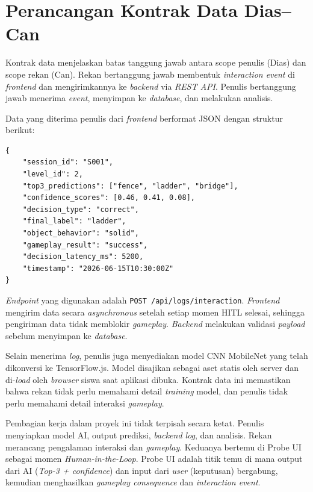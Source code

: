 \documentclass[10pt,twoside,openright]{report}
\begin{document}
\section{Perancangan Kontrak Data Dias--Can}
\label{sec:perancangan-kontrak-data}

Kontrak data menjelaskan batas tanggung jawab antara scope penulis (Dias) dan scope rekan (Can). Rekan bertanggung jawab membentuk \textit{interaction event} di \textit{frontend} dan mengirimkannya ke \textit{backend} via \textit{REST API}. Penulis bertanggung jawab menerima \textit{event}, menyimpan ke \textit{database}, dan melakukan analisis.

Data yang diterima penulis dari \textit{frontend} berformat JSON dengan struktur berikut:

\begin{verbatim}
{
    "session_id": "S001",
    "level_id": 2,
    "top3_predictions": ["fence", "ladder", "bridge"],
    "confidence_scores": [0.46, 0.41, 0.08],
    "decision_type": "correct",
    "final_label": "ladder",
    "object_behavior": "solid",
    "gameplay_result": "success",
    "decision_latency_ms": 5200,
    "timestamp": "2026-06-15T10:30:00Z"
}
\end{verbatim}

\textit{Endpoint} yang digunakan adalah \texttt{POST /api/logs/interaction}. \textit{Frontend} mengirim data secara \textit{asynchronous} setelah setiap momen HITL selesai, sehingga pengiriman data tidak memblokir \textit{gameplay}. \textit{Backend} melakukan validasi \textit{payload} sebelum menyimpan ke \textit{database}.

Selain menerima \textit{log}, penulis juga menyediakan model CNN MobileNet yang telah dikonversi ke TensorFlow.js. Model disajikan sebagai aset statis oleh server dan di-\textit{load} oleh \textit{browser} siswa saat aplikasi dibuka. Kontrak data ini memastikan bahwa rekan tidak perlu memahami detail \textit{training} model, dan penulis tidak perlu memahami detail interaksi \textit{gameplay}.

Pembagian kerja dalam proyek ini tidak terpisah secara ketat. Penulis menyiapkan model AI, output prediksi, \textit{backend log}, dan analisis. Rekan merancang pengalaman interaksi dan \textit{gameplay}. Keduanya bertemu di Probe UI sebagai momen \textit{Human-in-the-Loop}. Probe UI adalah titik temu di mana output dari AI (\textit{Top-3 + confidence}) dan input dari \textit{user} (keputusan) bergabung, kemudian menghasilkan \textit{gameplay consequence} dan \textit{interaction event}.
\end{document}
